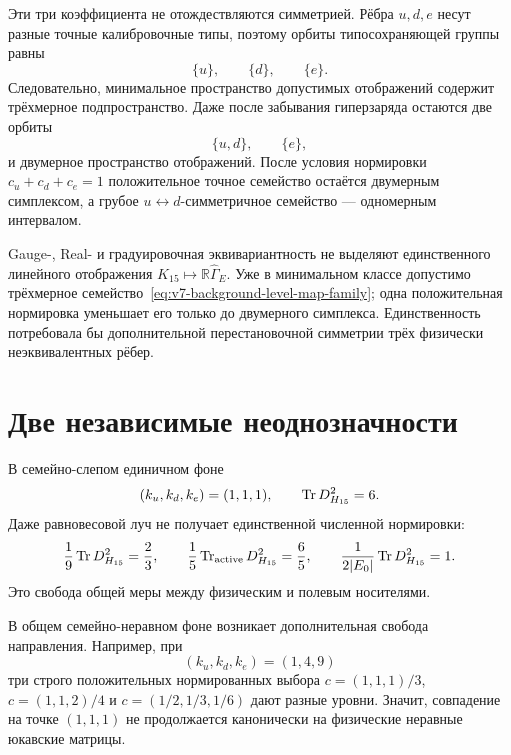 Эти три коэффициента не отождествляются симметрией. Рёбра $u,d,e$ несут
разные точные калибровочные типы, поэтому орбиты типосохраняющей группы
равны
\begin{equation}
 \{u\},\qquad\{d\},\qquad\{e\}.
 \label{eq:v7-background-level-exact-orbits}
\end{equation}
Следовательно, минимальное пространство допустимых отображений содержит
трёхмерное подпространство. Даже после забывания гиперзаряда остаются две
орбиты
\begin{equation}
 \{u,d\},\qquad\{e\},
 \label{eq:v7-background-level-coarse-orbits}
\end{equation}
и двумерное пространство отображений. После условия нормировки
$c_u+c_d+c_e=1$ положительное точное семейство остаётся двумерным
симплексом, а грубое $u\leftrightarrow d$-симметричное семейство ---
одномерным интервалом.

\begin{theorem}
Gauge-, Real- и градуировочная эквивариантность не выделяют единственного
линейного отображения $K_{15}\mapsto\mathbb R\widehat\Gamma_E$. Уже в
минимальном классе допустимо трёхмерное
семейство~\eqref{eq:v7-background-level-map-family};
одна положительная нормировка уменьшает его только до двумерного симплекса.
Единственность потребовала бы дополнительной перестановочной симметрии трёх
физически неэквивалентных рёбер.
\end{theorem}

\section{Две независимые неоднозначности}

В семейно-слепом единичном фоне
\begin{equation}
 (k_u,k_d,k_e)=(1,1,1),
 \qquad
 \operatorname{Tr} D_{H_{15}}^2=6.
 \label{eq:v7-background-level-unit-background}
\end{equation}
Даже равновесовой луч не получает единственной численной нормировки:
\begin{equation}
 \frac1{9}\operatorname{Tr} D_{H_{15}}^2=\frac23,
 \qquad
 \frac1{5}\operatorname{Tr}_{\rm active}D_{H_{15}}^2=\frac65,
 \qquad
 \frac1{2|E_0|}\operatorname{Tr} D_{H_{15}}^2=1.
 \label{eq:v7-background-level-trace-ambiguity}
\end{equation}
Это свобода общей меры между физическим и полевым носителями.

В общем семейно-неравном фоне возникает дополнительная свобода направления.
Например, при
\begin{equation}
 (k_u,k_d,k_e)=(1,4,9)
 \label{eq:v7-background-level-unequal-example}
\end{equation}
три строго положительных нормированных выбора
$c=(1,1,1)/3$, $c=(1,1,2)/4$ и $c=(1/2,1/3,1/6)$ дают разные уровни.
Значит, совпадение на точке $(1,1,1)$ не продолжается канонически на
физические неравные юкавские матрицы.

